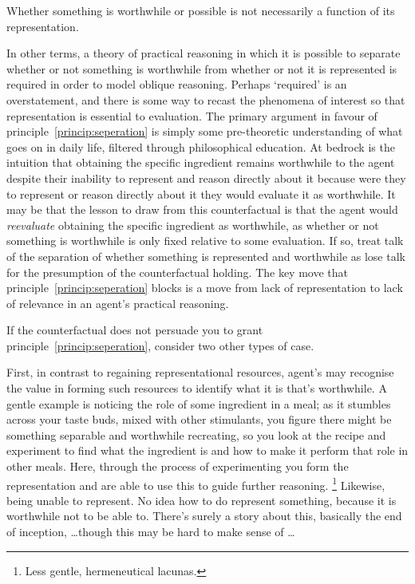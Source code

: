 \documentclass[10pt]{article}
\begin{document}
\begin{principle}\label{princip:seperation}
  Whether something is worthwhile or possible is not necessarily a function of its representation.
\end{principle}
In other terms, a theory of practical reasoning in which it is possible to separate whether or not something is worthwhile from whether or not it is represented is required in order to model {\color{blue} oblique reasoning}.
Perhaps `required' is an overstatement, and there is some way to recast the phenomena of interest so that representation is essential to evaluation.
The primary argument in favour of principle~\ref{princip:seperation} is simply some pre-theoretic understanding of what goes on in daily life, filtered through philosophical education.
At bedrock is the intuition that obtaining the specific ingredient remains worthwhile to the agent despite their inability to represent and reason directly about it because were they to represent or reason directly about it they would evaluate it as worthwhile.
It may be that the lesson to draw from this counterfactual is that the agent would \emph{reevaluate} obtaining the specific ingredient as worthwhile, as whether or not something is worthwhile is only fixed relative to some evaluation.
If so, treat talk of the separation of whether something is represented and worthwhile as lose talk for the presumption of the counterfactual holding.
The key move that principle~\ref{princip:seperation} blocks is a move from lack of representation to lack of relevance in an agent's practical reasoning.

If the counterfactual does not persuade you to grant principle~\ref{princip:seperation}, consider two other types of case.

First, in contrast to regaining representational resources, agent's may recognise the value in forming such resources to identify what it is that's worthwhile.
A gentle example is noticing the role of some ingredient in a meal; as it stumbles across your taste buds, mixed with other stimulants, you figure there might be something separable and worthwhile recreating, so you look at the recipe and experiment to find what the ingredient is and how to make it perform that role in other meals.
Here, through the process of experimenting you form the representation and are able to use this to guide further reasoning.\nolinebreak
\footnote{Less gentle, hermeneutical lacunas.}
Likewise, {\color{blue} being unable to represent.
  No idea how to do represent something, because it is worthwhile not to be able to.
  There's surely a story about this, basically the end of inception, \dots though this may be hard to make sense of \dots}
\end{document}
